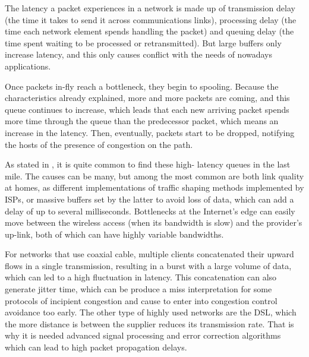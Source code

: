 The latency a packet experiences in a network is made up of transmission
delay (the time it takes to send it across communications links), processing
delay (the time each network element spends handling the packet) and queuing
delay (the time spent waiting to be processed or retransmitted). But large
buffers only increase latency, and this only causes conflict with the needs
of nowadays applications.

Once packets in-fly reach a bottleneck, they begin to spooling. Because the
characteristics already explained, more and more packets are coming, and this
queue continues to increase, which leads that each new arriving packet spends
more time through the queue than the predecessor packet, which means an
increase in the latency. Then, eventually, packets start to be dropped,
notifying the hosts of the presence of congestion on the path.

As stated in \cite{Dischinger2007CRB}, it is quite common to find these high-
latency queues in the last mile. The causes can be many, but among the most
common are both link quality at homes, as different implementations of traffic
shaping methods implemented by ISPs, or massive buffers set by the latter to
avoid loss of data, which can add a delay of up to several milliseconds.
Bottlenecks at the Internet's edge can easily move between the wireless
access (when its bandwidth is slow) and the provider's up-link, both of which
can have highly variable bandwidths.

For networks that use coaxial cable, multiple clients concatenated their
upward flows in a single transmission, resulting in a burst with a large
volume of data, which can led to a high fluctuation in latency. This
concatenation can also generate jitter time, which can be produce a miss
interpretation for some protocols of incipient congestion and cause to enter
into congestion control avoidance too early. The other type of highly used
networks are the DSL, which the more distance is between the supplier reduces
its transmission rate. That is why it is needed advanced signal processing and
error correction algorithms which can lead to high packet propagation delays.
